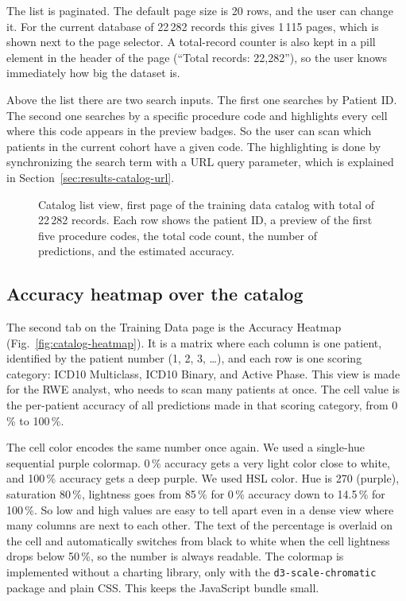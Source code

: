 The list is paginated. The default page size is 20 rows, and the user can change it. For the current database of 22\,282 records this gives 1\,115 pages, which is shown next to the page selector. A total-record counter is also kept in a pill element in the header of the page (``Total records: 22,282''), so the user knows immediately how big the dataset is.

Above the list there are two search inputs. The first one searches by Patient ID. The second one searches by a specific procedure code and highlights every cell where this code appears in the preview badges. So the user can scan which patients in the current cohort have a given code. The highlighting is done by synchronizing the search term with a URL query parameter, which is explained in Section~\ref{sec:results-catalog-url}.

\begin{figure}[h]
    \centering
    \caption{Catalog list view, first page of the training data catalog with total of 22\,282 records. Each row shows the patient ID, a preview of the first five procedure codes, the total code count, the number of predictions, and the estimated accuracy.}
    \label{fig:catalog-list}
\end{figure}

\subsection{Accuracy heatmap over the catalog}
\label{sec:results-catalog-heatmap}

The second tab on the Training Data page is the Accuracy Heatmap (Fig.~\ref{fig:catalog-heatmap}). It is a matrix where each column is one patient, identified by the patient number (1, 2, 3, \dots), and each row is one scoring category: ICD10 Multiclass, ICD10 Binary, and Active Phase. This view is made for the RWE analyst, who needs to scan many patients at once. The cell value is the per-patient accuracy of all predictions made in that scoring category, from 0\,\% to 100\,\%.

The cell color encodes the same number once again. We used a single-hue sequential purple colormap. 0\,\% accuracy gets a very light color close to white, and 100\,\% accuracy gets a deep purple. We used HSL color. Hue is 270 (purple), saturation 80\,\%, lightness goes from 85\,\% for 0\,\% accuracy down to 14.5\,\% for 100\,\%. So low and high values are easy to tell apart even in a dense view where many columns are next to each other. The text of the percentage is overlaid on the cell and automatically switches from black to white when the cell lightness drops below 50\,\%, so the number is always readable. The colormap is implemented without a charting library, only with the \texttt{d3-scale-chromatic} package and plain CSS. This keeps the JavaScript bundle small.

